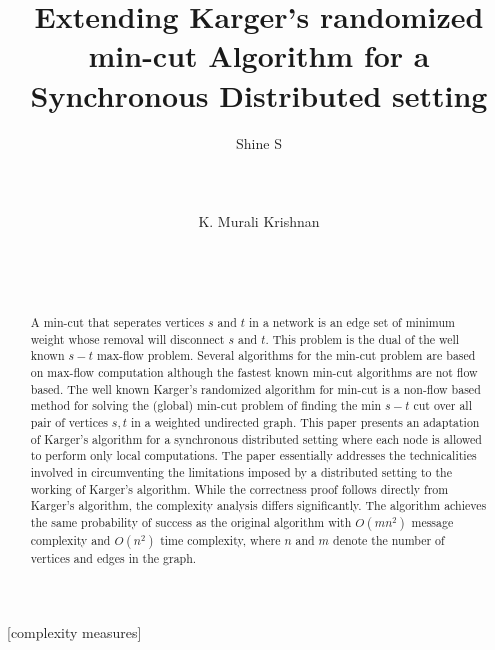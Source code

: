 \documentclass{acm_proc_article-sp}
\begin{document}
\title{Extending Karger's randomized min-cut Algorithm for a Synchronous Distributed setting}


 \author{
\alignauthor
Shine S \\
       \\
       \\
       \\
\alignauthor
K. Murali Krishnan \\
       \\
       \\
       \\
}


\maketitle
\begin{abstract}
A min-cut that seperates vertices $s$ and $t$ in a network is an edge
set of minimum weight whose removal will disconnect $s$ and $t$.  This
problem is the dual of the well known $s-t$ max-flow problem. Several
algorithms for the min-cut problem are based on max-flow computation
although the fastest known min-cut algorithms are not flow based. The well known Karger's randomized algorithm for
min-cut is a non-flow based method for solving the
(global) min-cut problem of finding the min
$s-t$ cut over all pair of vertices $s,t$ in a weighted undirected
graph. This paper presents an adaptation of Karger's algorithm for a synchronous distributed setting
where each node is allowed to perform only local computations.  The paper essentially
addresses the technicalities involved in circumventing the limitations
imposed by a distributed setting to the working of Karger's algorithm.
While the correctness proof follows directly from Karger's algorithm,
the complexity analysis differs significantly.
The algorithm achieves the same probability of success as the original
algorithm with $O(mn^{2})$ message complexity and $O(n^{2})$ time
complexity, where $n$ and $m$ denote the number of vertices and edges
in the graph.
\end{abstract}

[complexity measures]
\end{document}

